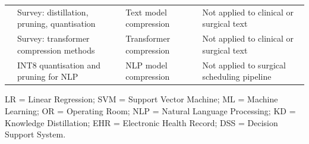 \begin{table}[tp]
\begin{threeparttable}
\begin{tabularx}{\linewidth}{@{}lXlX@{}}
\cite{gupta2022compression}  & Survey: distillation, pruning, quantisation & Text model compression & Not applied to clinical or surgical text \\
\cite{tang2024survey}        & Survey: transformer compression methods & Transformer compression & Not applied to clinical or surgical text \\
\cite{bibi2024advances}      & INT8 quantisation and pruning for NLP & NLP model compression & Not applied to surgical scheduling pipeline \\
\bottomrule
\end{tabularx}
\begin{tablenotes}
\small
\item LR = Linear Regression; SVM = Support Vector Machine; ML = Machine Learning; OR = Operating Room; NLP = Natural Language Processing; KD = Knowledge Distillation; EHR = Electronic Health Record; DSS = Decision Support System.
\end{tablenotes}
\end{threeparttable}
\end{table}

